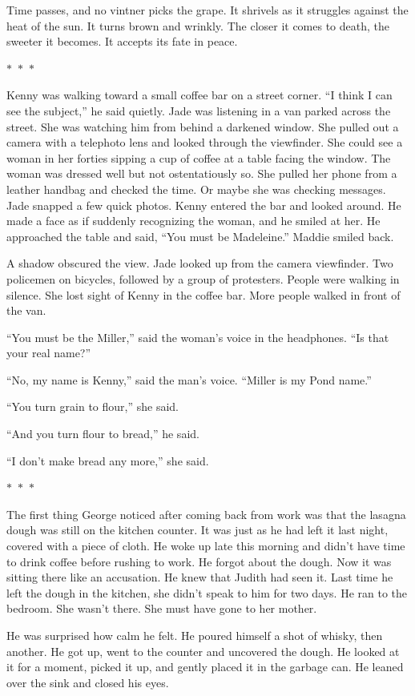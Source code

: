 \documentclass{memoir}
\newcommand{\starbreak}{%
\begin{center}
  $\ast$~$\ast$~$\ast$
\end{center}
}
\begin{document}
Time passes, and no vintner picks the grape. It shrivels as it struggles against the heat of the sun. It turns brown and wrinkly. The closer it comes to death, the sweeter it becomes. It accepts its fate in peace. 

\starbreak

Kenny was walking toward a small coffee bar on a street corner. ``I think I can see the subject,'' he said quietly. Jade was listening in a van parked across the street. She was watching him from behind a darkened window. She pulled out a camera with a telephoto lens and looked through the viewfinder. She could see a woman in her forties sipping a cup of coffee at a table facing the window. The woman was dressed well but not ostentatiously so. She pulled her phone from a leather handbag and checked the time. Or maybe she was checking messages. Jade snapped a few quick photos. Kenny entered the bar and looked around. He made a face as if suddenly recognizing the woman, and he smiled at her. He approached the table and said, ``You must be Madeleine.'' Maddie smiled back.

A shadow obscured the view. Jade looked up from the camera viewfinder. Two policemen on bicycles, followed by a group of protesters. People were walking in silence. She lost sight of Kenny in the coffee bar. More people walked in front of the van. 

``You must be the Miller,'' said the woman's voice in the headphones. ``Is that your real name?''

``No, my name is Kenny,'' said the man's voice. ``Miller is my Pond name.''

``You turn grain to flour,'' she said.

``And you turn flour to bread,'' he said.

``I don't make bread any more,'' she said.

\starbreak

The first thing George noticed after coming back from work was that the lasagna dough was still on the kitchen counter. It was just as he had left it last night, covered with a piece of cloth. He woke up late this morning and didn't have time to drink coffee before rushing to work. He forgot about the dough. Now it was sitting there like an accusation. He knew that Judith had seen it. Last time he left the dough in the kitchen, she didn't speak to him for two days. He ran to the bedroom. She wasn't there. She must have gone to her mother. 

He was surprised how calm he felt. He poured himself a shot of whisky, then another. He got up, went to the counter and uncovered the dough. He looked at it for a moment, picked it up, and gently placed it in the garbage can. He leaned over the sink and closed his eyes. 
\end{document}
